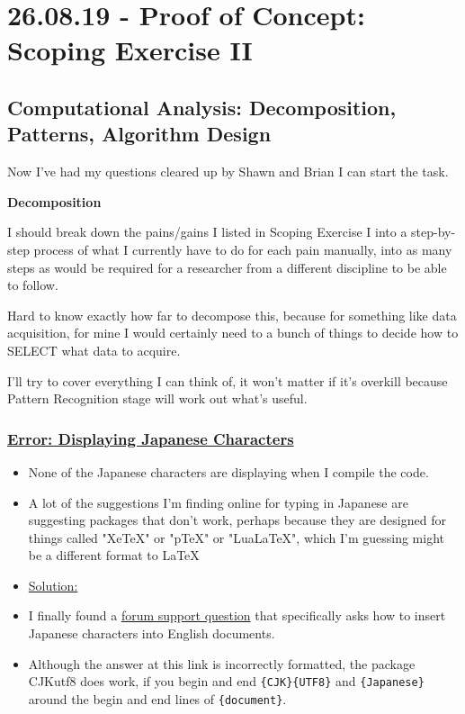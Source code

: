 \documentclass[12pt]{article}
\begin{document}
\section{26.08.19 - Proof of Concept: Scoping Exercise II}
\subsection{Computational Analysis: Decomposition, Patterns, Algorithm Design}
Now I've had my questions cleared up by Shawn and Brian I can start the task. 

\textbf{Decomposition}

I should break down the pains/gains I listed in Scoping Exercise I into a step-by-step process of what I currently have to do for each pain manually, into as many steps as would be required for a researcher from a different discipline to be able to follow. 

Hard to know exactly how far to decompose this, because for something like data acquisition, for mine I would certainly need to a bunch of things to decide how to SELECT what data to acquire. 

I'll try to cover everything I can think of, it won't matter if it's overkill because Pattern Recognition stage will work out what's useful.

\newpage
\subsubsection{\underline{Error: Displaying Japanese Characters}}\label{error:er11}
\begin{itemize}
    \item None of the Japanese characters are displaying when I compile the code.
    \item A lot of the suggestions I'm finding online for typing in Japanese are suggesting packages that don't work, perhaps because they are designed for things called "XeTeX" or "pTeX" or "LuaLaTeX", which I'm guessing might be a different format to LaTeX
\end{itemize}
\begin{itemize}
\renewcommand{\labelitemi}{$\nobullet$}
\item \underline{Solution:}
\renewcommand{\labelitemi}{$\bullet$}
    \item I finally found a \href{https://tex.stackexchange.com/questions/68333/how-to-put-japanese-kanji-characters-into-an-english-document}{forum support question} that specifically asks how to insert Japanese characters into English documents.
    \item Although the answer at this link is incorrectly formatted, the package CJKutf8 does work, if you begin and end \texttt{\{CJK\}\{UTF8\}} and \texttt{\{Japanese\}} around the begin and end lines of \texttt{\{document\}}.
\end{itemize}
\end{document}
